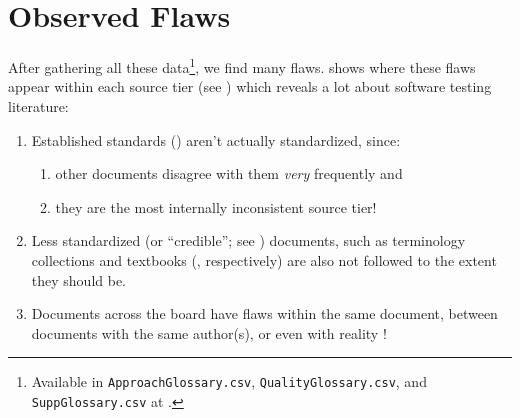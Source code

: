 \section{Observed Flaws}\label{flaws}


After gathering all these data\footnote{Available in \texttt{ApproachGlossary.csv},
    \texttt{QualityGlossary.csv}, and \texttt{SuppGlossary.csv} at .}, we find many flaws.
 shows where these flaws appear within each source tier (see
) which reveals a lot about software testing literature:
\begin{enumerate}
    \item Established standards () aren't actually standardized, since:
          \begin{enumerate}
              \item other documents disagree with them \emph{very} frequently and
              \item they are the most internally inconsistent source tier!
          \end{enumerate}
    \item Less standardized (or ``credible''; see ) documents,
          such as terminology collections and textbooks (,
          respectively) are also not followed to the extent they should be.
    \item Documents across the board have flaws within the same document,
          between documents with the same author(s), or even with reality%
          !
\end{enumerate}


